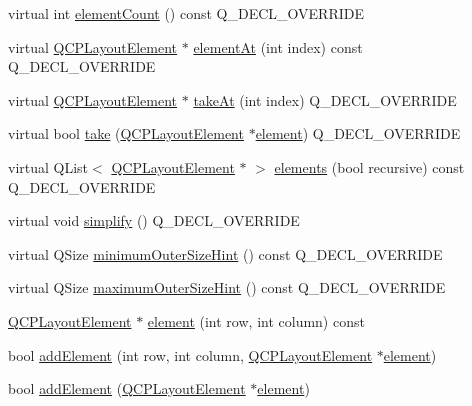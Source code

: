 \begin{DoxyCompactItemize}
\item 
virtual int \hyperlink{classQCPLayoutGrid_a9a8942aface780a02445ebcf14c48513}{element\+Count} () const Q\+\_\+\+D\+E\+C\+L\+\_\+\+O\+V\+E\+R\+R\+I\+DE
\item 
virtual \hyperlink{classQCPLayoutElement}{Q\+C\+P\+Layout\+Element} $\ast$ \hyperlink{classQCPLayoutGrid_a4288f174082555f6bd92021bdedb75dc}{element\+At} (int index) const Q\+\_\+\+D\+E\+C\+L\+\_\+\+O\+V\+E\+R\+R\+I\+DE
\item 
virtual \hyperlink{classQCPLayoutElement}{Q\+C\+P\+Layout\+Element} $\ast$ \hyperlink{classQCPLayoutGrid_a17dd220234d1bbf8835abcc666384d45}{take\+At} (int index) Q\+\_\+\+D\+E\+C\+L\+\_\+\+O\+V\+E\+R\+R\+I\+DE
\item 
virtual bool \hyperlink{classQCPLayoutGrid_aee961c2eb6cf8a85dcbc5a7d7b6c1a00}{take} (\hyperlink{classQCPLayoutElement}{Q\+C\+P\+Layout\+Element} $\ast$\hyperlink{classQCPLayoutGrid_a525f25e6ba43ee228151d074251b4e6a}{element}) Q\+\_\+\+D\+E\+C\+L\+\_\+\+O\+V\+E\+R\+R\+I\+DE
\item 
virtual Q\+List$<$ \hyperlink{classQCPLayoutElement}{Q\+C\+P\+Layout\+Element} $\ast$ $>$ \hyperlink{classQCPLayoutGrid_a7d5b968b4cf57393e9e387976d91f8f7}{elements} (bool recursive) const Q\+\_\+\+D\+E\+C\+L\+\_\+\+O\+V\+E\+R\+R\+I\+DE
\item 
virtual void \hyperlink{classQCPLayoutGrid_a38621ca7aa633b6a9a88617df7f08672}{simplify} () Q\+\_\+\+D\+E\+C\+L\+\_\+\+O\+V\+E\+R\+R\+I\+DE
\item 
virtual Q\+Size \hyperlink{classQCPLayoutGrid_a0438bc58b4d3894d01db95b08d4268df}{minimum\+Outer\+Size\+Hint} () const Q\+\_\+\+D\+E\+C\+L\+\_\+\+O\+V\+E\+R\+R\+I\+DE
\item 
virtual Q\+Size \hyperlink{classQCPLayoutGrid_a41ce0014c220d77b909e2ca937f0e599}{maximum\+Outer\+Size\+Hint} () const Q\+\_\+\+D\+E\+C\+L\+\_\+\+O\+V\+E\+R\+R\+I\+DE
\item 
\hyperlink{classQCPLayoutElement}{Q\+C\+P\+Layout\+Element} $\ast$ \hyperlink{classQCPLayoutGrid_a525f25e6ba43ee228151d074251b4e6a}{element} (int row, int column) const 
\item 
bool \hyperlink{classQCPLayoutGrid_adff1a2ca691ed83d2d24a4cd1fe17012}{add\+Element} (int row, int column, \hyperlink{classQCPLayoutElement}{Q\+C\+P\+Layout\+Element} $\ast$\hyperlink{classQCPLayoutGrid_a525f25e6ba43ee228151d074251b4e6a}{element})
\item 
bool \hyperlink{classQCPLayoutGrid_a4c44025dd25acd27e053cadfd448ad7b}{add\+Element} (\hyperlink{classQCPLayoutElement}{Q\+C\+P\+Layout\+Element} $\ast$\hyperlink{classQCPLayoutGrid_a525f25e6ba43ee228151d074251b4e6a}{element})

\end{DoxyCompactItemize}
